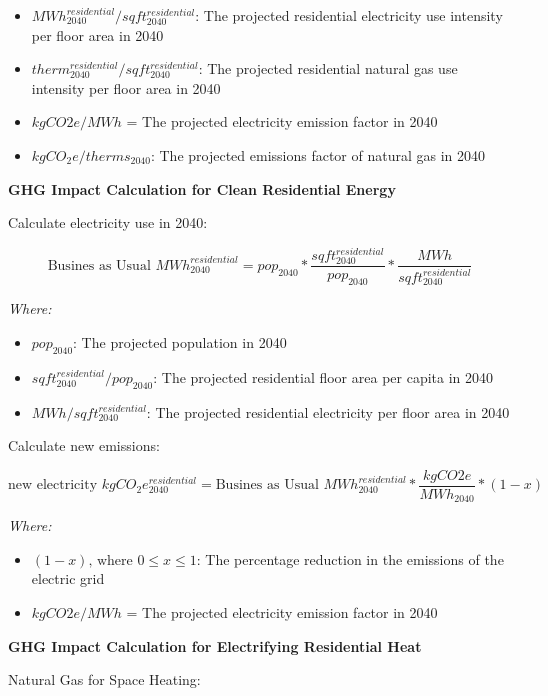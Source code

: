 \documentclass[
]{book}
\providecommand{\tightlist}{%
  \setlength{\itemsep}{0pt}\setlength{\parskip}{0pt}}
\begin{document}
\begin{itemize}
\tightlist
\item
  \(MWh_{2040}^{residential}/sqft_{2040}^{residential}\): The projected residential electricity use intensity per floor area in 2040
\item
  \(therm_{2040}^{residential}/sqft_{2040}^{residential}\): The projected residential natural gas use intensity per floor area in 2040
\item
  \(kgCO2e/MWh\) = The projected electricity emission factor in 2040
\item
  \(kgCO_2e/therms_{2040}\): The projected emissions factor of natural gas in 2040
\end{itemize}

\textbf{GHG Impact Calculation for Clean Residential Energy}

Calculate electricity use in 2040:

\[
\text{Busines as Usual }MWh_{2040}^{residential} = pop_{2040} * \frac{sqft_{2040}^{residential}}{pop_{2040}} * \frac{MWh}{sqft_{2040}^{residential}}
\]

\emph{Where:}

\begin{itemize}
\tightlist
\item
  \(pop_{2040}\): The projected population in 2040
\item
  \(sqft_{2040}^{residential}/pop_{2040}\): The projected residential floor area per capita in 2040
\item
  \(MWh/sqft_{2040}^{residential}\): The projected residential electricity per floor area in 2040
\end{itemize}

Calculate new emissions:

\[\text{new electricity }kgCO_2e^{residential}_{2040} = \text{Busines as Usual }MWh_{2040}^{residential} *  \frac{kgCO2e}{MWh_{2040}} * (1-x) \]

\emph{Where:}

\begin{itemize}
\tightlist
\item
  \((1-x) \text{, where } 0 \le x \le 1\): The percentage reduction in the emissions of the electric grid
\item
  \(kgCO2e/MWh\) = The projected electricity emission factor in 2040
\end{itemize}

\textbf{GHG Impact Calculation for Electrifying Residential Heat}

Natural Gas for Space Heating:
\end{document}
